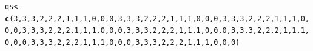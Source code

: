 \documentclass{article}\usepackage[]{graphicx}\usepackage[]{color}
\makeatletter
\newcommand{\hlnum}[1]{\textcolor[rgb]{0.686,0.059,0.569}{#1}}%
\newcommand{\hlstd}[1]{\textcolor[rgb]{0.345,0.345,0.345}{#1}}%
\newcommand{\hlkwb}[1]{\textcolor[rgb]{0.69,0.353,0.396}{#1}}%
\newcommand{\hlkwd}[1]{\textcolor[rgb]{0.737,0.353,0.396}{\textbf{#1}}}%
\newenvironment{kframe}{%
 \def\at@end@of@kframe{}%
 \ifinner\ifhmode%
  \def\at@end@of@kframe{\end{minipage}}%
  \begin{minipage}{\columnwidth}%
 \fi\fi%
 \def\FrameCommand##1{\hskip\@totalleftmargin \hskip-\fboxsep
 \colorbox{shadecolor}{##1}\hskip-\fboxsep
     \hskip-\linewidth \hskip-\@totalleftmargin \hskip\columnwidth}%
 \MakeFramed {\advance\hsize-\width
   \@totalleftmargin\z@ \linewidth\hsize
   \@setminipage}}%
 {\par\unskip\endMakeFramed%
 \at@end@of@kframe}
\newenvironment{knitrout}{}{} %
\makeatother
\begin{document}
\begin{knitrout}
\begin{kframe}
\begin{alltt}
\hlstd{qs} \hlkwb{<-} \hlkwd{c}\hlstd{(}\hlnum{3}\hlstd{,}\hlnum{3}\hlstd{,}\hlnum{3}\hlstd{,}\hlnum{2}\hlstd{,}\hlnum{2}\hlstd{,}\hlnum{2}\hlstd{,}\hlnum{1}\hlstd{,}\hlnum{1}\hlstd{,}\hlnum{1}\hlstd{,}\hlnum{0}\hlstd{,}\hlnum{0}\hlstd{,}\hlnum{0}\hlstd{,}\hlnum{3}\hlstd{,}\hlnum{3}\hlstd{,}\hlnum{3}\hlstd{,}\hlnum{2}\hlstd{,}\hlnum{2}\hlstd{,}\hlnum{2}\hlstd{,}\hlnum{1}\hlstd{,}\hlnum{1}\hlstd{,}\hlnum{1}\hlstd{,}\hlnum{0}\hlstd{,}\hlnum{0}\hlstd{,}\hlnum{0}\hlstd{,}\hlnum{3}\hlstd{,}\hlnum{3}\hlstd{,}\hlnum{3}\hlstd{,}\hlnum{2}\hlstd{,}\hlnum{2}\hlstd{,}\hlnum{2}\hlstd{,}\hlnum{1}\hlstd{,}\hlnum{1}\hlstd{,}\hlnum{1}\hlstd{,}\hlnum{0}\hlstd{,}\hlnum{0}\hlstd{,}\hlnum{0}\hlstd{,}\hlnum{3}\hlstd{,}\hlnum{3}\hlstd{,}\hlnum{3}\hlstd{,}\hlnum{2}\hlstd{,}\hlnum{2}\hlstd{,}\hlnum{2}\hlstd{,}\hlnum{1}\hlstd{,}\hlnum{1}\hlstd{,}\hlnum{1}\hlstd{,}\hlnum{0}\hlstd{,}\hlnum{0}\hlstd{,}\hlnum{0}\hlstd{,}\hlnum{3}\hlstd{,}\hlnum{3}\hlstd{,}\hlnum{3}\hlstd{,}\hlnum{2}\hlstd{,}\hlnum{2}\hlstd{,}\hlnum{2}\hlstd{,}\hlnum{1}\hlstd{,}\hlnum{1}\hlstd{,}\hlnum{1}\hlstd{,}\hlnum{0}\hlstd{,}\hlnum{0}\hlstd{,}\hlnum{0}\hlstd{,}\hlnum{3}\hlstd{,}\hlnum{3}\hlstd{,}\hlnum{3}\hlstd{,}\hlnum{2}\hlstd{,}\hlnum{2}\hlstd{,}\hlnum{2}\hlstd{,}\hlnum{1}\hlstd{,}\hlnum{1}\hlstd{,}\hlnum{1}\hlstd{,}\hlnum{0}\hlstd{,}\hlnum{0}\hlstd{,}\hlnum{0}\hlstd{,}\hlnum{3}\hlstd{,}\hlnum{3}\hlstd{,}\hlnum{3}\hlstd{,}\hlnum{2}\hlstd{,}\hlnum{2}\hlstd{,}\hlnum{2}\hlstd{,}\hlnum{1}\hlstd{,}\hlnum{1}\hlstd{,}\hlnum{1}\hlstd{,}\hlnum{0}\hlstd{,}\hlnum{0}\hlstd{,}\hlnum{0}\hlstd{,}\hlnum{3}\hlstd{,}\hlnum{3}\hlstd{,}\hlnum{3}\hlstd{,}\hlnum{2}\hlstd{,}\hlnum{2}\hlstd{,}\hlnum{2}\hlstd{,}\hlnum{1}\hlstd{,}\hlnum{1}\hlstd{,}\hlnum{1}\hlstd{,}\hlnum{0}\hlstd{,}\hlnum{0}\hlstd{,}\hlnum{0}\hlstd{)}

\end{alltt}
\end{kframe}
\end{knitrout}
\end{document}
